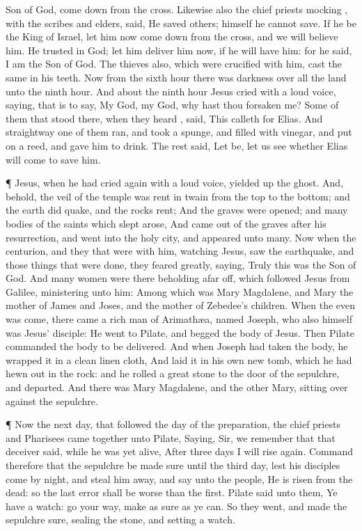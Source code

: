 {Son of
God, come
down
from the
cross.
Likewise
also the chief
priests
mocking
{},
with the
scribes
and
elders,
said,
He
saved
others;
himself
he
cannot
save.
If he
be the
King of
Israel, let
him
now come
down
from the
cross,
and we will
believe
him.
He
trusted
in
God; let him
deliver
him
now,
if he will
have
him:
for he
said, I
am the
Son of
God.
The
thieves
also, which were crucified
with
him,
cast the
same in
his
teeth.
Now
from the
sixth
hour there
was
darkness
over
all the
land
unto the
ninth
hour.
And
about
the
ninth
hour
Jesus cried
with
a
loud
voice,
saying,
{}
that is to
say,
My
God,
my
God,
why hast thou
forsaken
me?
Some of them that
stood
there, when they
heard
{},
said,
This
{} calleth
for
Elias.
And
straightway
one
of
them
ran,
and
took a
spunge,
and
filled
{} with
vinegar,
and
put
{} on a
reed, and
gave
him to
drink.
The
rest
said, Let
be, let us
see
whether
Elias will
come to
save
him.
\par }{\PP {}¶
Jesus, when he had
cried
again
with
a
loud
voice, yielded
up the
ghost.
And,
behold, the
veil of the
temple was
rent
in
twain
from the
top
to the
bottom;
and the
earth did
quake,
and the
rocks
rent;
And the
graves were
opened;
and
many
bodies of the
saints which
slept
arose,
And came
out
of the
graves
after
his
resurrection, and
went
into
the
holy
city,
and
appeared unto
many.
Now
when the
centurion,
and they that
were
with
him,
watching
Jesus,
saw the
earthquake,
and those things that were
done, they
feared
greatly,
saying,
Truly
this
was the
Son of
God.
And
many
women
were
there
beholding
afar
off,
which
followed
Jesus
from
Galilee,
ministering unto
him:
Among
which
was
Mary
Magdalene,
and
Mary the
mother of
James
and
Joses,
and the
mother of
Zebedee’s
children.
When the
even was
come, there
came a
rich
man
of
Arimathæa,
named
Joseph,
who
also
himself
was
Jesus’
disciple:
He went
to
Pilate, and
begged the
body of
Jesus.
Then
Pilate
commanded the
body to be
delivered.
And
when
Joseph had
taken the
body, he
wrapped
it
in a
clean linen
cloth,
And
laid
it
in his
own
new
tomb,
which he had hewn
out
in the
rock:
and he
rolled
a
great
stone to the
door of the
sepulchre, and
departed.
And
there
was
Mary
Magdalene,
and the
other
Mary,
sitting over
against the
sepulchre.
\par }{\PP {}¶
Now the next
day,
that
followed the day of the
preparation, the chief
priests
and
Pharisees came
together
unto
Pilate,
Saying,
Sir, we
remember
that
that
deceiver
said, while he
was
yet
alive,
After
three
days I will rise
again.
Command
therefore
that the
sepulchre be made
sure
until
the
third
day,
lest
his
disciples
come by
night, and
steal him
away,
and
say unto the
people, He is
risen
from the
dead:
so the
last
error shall
be worse
than the
first.
Pilate
said unto
them, Ye
have a
watch: go your
way,
make
{} as
sure
as ye
can.
So
they
went, and
made the
sepulchre
sure,
sealing the
stone, and
setting a
watch.

}
